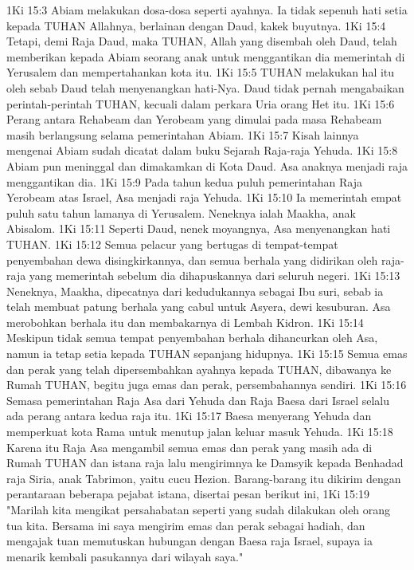 1Ki 15:3  Abiam melakukan dosa-dosa seperti ayahnya. Ia tidak sepenuh hati setia kepada TUHAN Allahnya, berlainan dengan Daud, kakek buyutnya.
1Ki 15:4  Tetapi, demi Raja Daud, maka TUHAN, Allah yang disembah oleh Daud, telah memberikan kepada Abiam seorang anak untuk menggantikan dia memerintah di Yerusalem dan mempertahankan kota itu.
1Ki 15:5  TUHAN melakukan hal itu oleh sebab Daud telah menyenangkan hati-Nya. Daud tidak pernah mengabaikan perintah-perintah TUHAN, kecuali dalam perkara Uria orang Het itu.
1Ki 15:6  Perang antara Rehabeam dan Yerobeam yang dimulai pada masa Rehabeam masih berlangsung selama pemerintahan Abiam.
1Ki 15:7  Kisah lainnya mengenai Abiam sudah dicatat dalam buku Sejarah Raja-raja Yehuda.
1Ki 15:8  Abiam pun meninggal dan dimakamkan di Kota Daud. Asa anaknya menjadi raja menggantikan dia.
1Ki 15:9  Pada tahun kedua puluh pemerintahan Raja Yerobeam atas Israel, Asa menjadi raja Yehuda.
1Ki 15:10  Ia memerintah empat puluh satu tahun lamanya di Yerusalem. Neneknya ialah Maakha, anak Abisalom.
1Ki 15:11  Seperti Daud, nenek moyangnya, Asa menyenangkan hati TUHAN.
1Ki 15:12  Semua pelacur yang bertugas di tempat-tempat penyembahan dewa disingkirkannya, dan semua berhala yang didirikan oleh raja-raja yang memerintah sebelum dia dihapuskannya dari seluruh negeri.
1Ki 15:13  Neneknya, Maakha, dipecatnya dari kedudukannya sebagai Ibu suri, sebab ia telah membuat patung berhala yang cabul untuk Asyera, dewi kesuburan. Asa merobohkan berhala itu dan membakarnya di Lembah Kidron.
1Ki 15:14  Meskipun tidak semua tempat penyembahan berhala dihancurkan oleh Asa, namun ia tetap setia kepada TUHAN sepanjang hidupnya.
1Ki 15:15  Semua emas dan perak yang telah dipersembahkan ayahnya kepada TUHAN, dibawanya ke Rumah TUHAN, begitu juga emas dan perak, persembahannya sendiri.
1Ki 15:16  Semasa pemerintahan Raja Asa dari Yehuda dan Raja Baesa dari Israel selalu ada perang antara kedua raja itu.
1Ki 15:17  Baesa menyerang Yehuda dan memperkuat kota Rama untuk menutup jalan keluar masuk Yehuda.
1Ki 15:18  Karena itu Raja Asa mengambil semua emas dan perak yang masih ada di Rumah TUHAN dan istana raja lalu mengirimnya ke Damsyik kepada Benhadad raja Siria, anak Tabrimon, yaitu cucu Hezion. Barang-barang itu dikirim dengan perantaraan beberapa pejabat istana, disertai pesan berikut ini,
1Ki 15:19  "Marilah kita mengikat persahabatan seperti yang sudah dilakukan oleh orang tua kita. Bersama ini saya mengirim emas dan perak sebagai hadiah, dan mengajak tuan memutuskan hubungan dengan Baesa raja Israel, supaya ia menarik kembali pasukannya dari wilayah saya."
